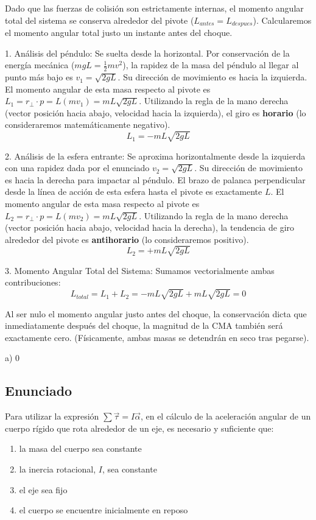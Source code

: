 \documentclass[12pt, a4paper]{article}
\begin{document}
Dado que las fuerzas de colisión son estrictamente internas, el momento angular total del sistema se conserva alrededor del pivote ($L_{antes} = L_{despues}$). Calcularemos el momento angular total justo un instante antes del choque.

1. Análisis del péndulo:
Se suelta desde la horizontal. Por conservación de la energía mecánica ($mgL = \frac{1}{2}mv^2$), la rapidez de la masa del péndulo al llegar al punto más bajo es $v_1 = \sqrt{2gL}$. Su dirección de movimiento es hacia la izquierda.
El momento angular de esta masa respecto al pivote es $L_1 = r_{\perp} \cdot p = L(m v_1) = mL\sqrt{2gL}$. 
Utilizando la regla de la mano derecha (vector posición hacia abajo, velocidad hacia la izquierda), el giro es \textbf{horario} (lo consideraremos matemáticamente negativo).
$$L_1 = -mL\sqrt{2gL}$$

2. Análisis de la esfera entrante:
Se aproxima horizontalmente desde la izquierda con una rapidez dada por el enunciado $v_2 = \sqrt{2gL}$. Su dirección de movimiento es hacia la derecha para impactar al péndulo.
El brazo de palanca perpendicular desde la línea de acción de esta esfera hasta el pivote es exactamente $L$.
El momento angular de esta masa respecto al pivote es $L_2 = r_{\perp} \cdot p = L(m v_2) = mL\sqrt{2gL}$.
Utilizando la regla de la mano derecha (vector posición hacia abajo, velocidad hacia la derecha), la tendencia de giro alrededor del pivote es \textbf{antihorario} (lo consideraremos positivo).
$$L_2 = +mL\sqrt{2gL}$$

3. Momento Angular Total del Sistema:
Sumamos vectorialmente ambas contribuciones:
$$L_{total} = L_1 + L_2 = -mL\sqrt{2gL} + mL\sqrt{2gL} = 0$$

Al ser nulo el momento angular justo antes del choque, la conservación dicta que inmediatamente después del choque, la magnitud de la CMA también será exactamente cero. (Físicamente, ambas masas se detendrán en seco tras pegarse).

\begin{tcolorbox}[colback=green!5!white, colframe=green!50!black, title=Respuesta Final]
\centering \Large a) $0$
\end{tcolorbox}

\newpage

\subsection*{Enunciado}
Para utilizar la expresión $\sum \vec{\tau} = I \vec{\alpha}$, en el cálculo de la aceleración angular de un cuerpo rígido que rota alrededor de un eje, es necesario y suficiente que:
\begin{enumerate}[label=\alph*)]
    \item la masa del cuerpo sea constante
    \item la inercia rotacional, $I$, sea constante
    \item el eje sea fijo
    \item el cuerpo se encuentre inicialmente en reposo
\end{enumerate}
\end{document}
